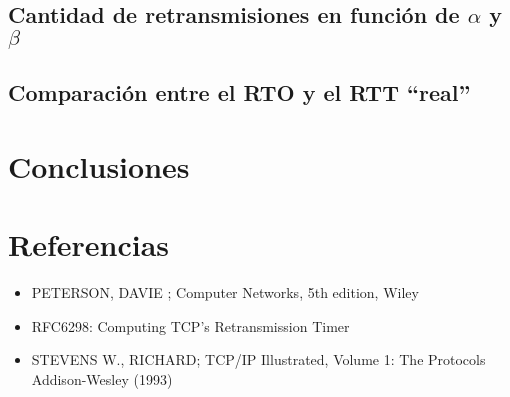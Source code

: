 \documentclass[10pt, a4paper]{article}
\begin{document}
\subsection{Cantidad de retransmisiones en función de $\alpha$ y $\beta$}

\subsection{Comparación entre el RTO y el RTT ``real''}

\section{Conclusiones}


\section{Referencias}
\begin{itemize}
\item PETERSON, DAVIE ; Computer Networks, 5th edition, Wiley

\item{RFC6298: Computing TCP's Retransmission Timer}

\item{STEVENS W., RICHARD; TCP/IP Illustrated, Volume 1: The Protocols Addison-Wesley (1993)}

\end{itemize}
\end{document}
